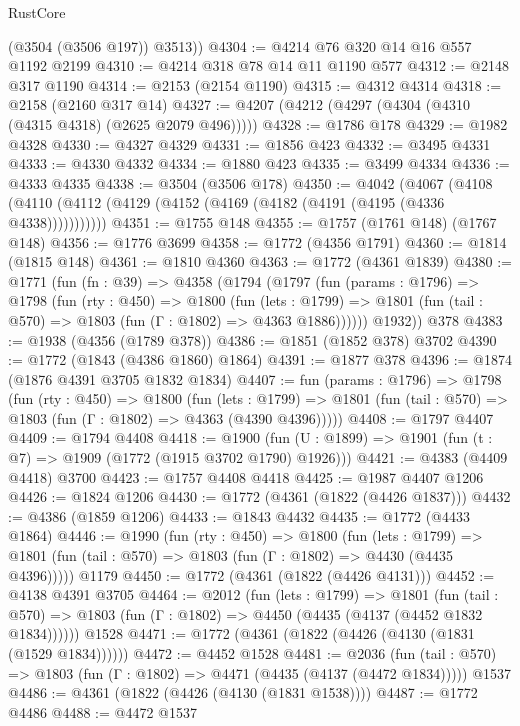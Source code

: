 \begin{lexlean}{RustCore}
\begin{coremodule}
        (@3504 (@3506 @197))
        @3513))
@4304 := @4214 @76 @320 @14 @16 @557 @1192 @2199
@4310 := @4214 @318 @78 @14 @11 @1190 @577
@4312 := @2148 @317 @1190
@4314 := @2153 (@2154 @1190)
@4315 := @4312 @4314
@4318 := @2158 (@2160 @317 @14)
@4327 := @4207 (@4212 (@4297 (@4304 (@4310 (@4315 @4318) (@2625 @2079 @496)))))
@4328 := @1786 @178
@4329 := @1982 @4328
@4330 := @4327 @4329
@4331 := @1856 @423
@4332 := @3495 @4331
@4333 := @4330 @4332
@4334 := @1880 @423
@4335 := @3499 @4334
@4336 := @4333 @4335
@4338 := @3504 (@3506 @178)
@4350 := @4042
    (@4067 (@4108 (@4110 (@4112 (@4129 (@4152 (@4169 (@4182 (@4191 (@4195 (@4336 @4338)))))))))))
@4351 := @1755 @148
@4355 := @1757 (@1761 @148) (@1767 @148)
@4356 := @1776 @3699
@4358 := @1772 (@4356 @1791)
@4360 := @1814 (@1815 @148)
@4361 := @1810 @4360
@4363 := @1772 (@4361 @1839)
@4380 := @1771
    (fun (fn : @39) =>
    @4358
      (@1794
        (@1797
          (fun (params : @1796) =>
          @1798
            (fun (rty : @450) =>
            @1800
              (fun (lets : @1799) =>
              @1801 (fun (tail : @570) => @1803 (fun (Γ : @1802) => @4363 @1886))))))
        @1932))
    @378
@4383 := @1938 (@4356 (@1789 @378))
@4386 := @1851 (@1852 @378) @3702
@4390 := @1772 (@1843 (@4386 @1860) @1864)
@4391 := @1877 @378
@4396 := @1874 (@1876 @4391 @3705 @1832 @1834)
@4407 := fun (params : @1796) =>
  @1798
    (fun (rty : @450) =>
    @1800
      (fun (lets : @1799) =>
      @1801 (fun (tail : @570) => @1803 (fun (Γ : @1802) => @4363 (@4390 @4396)))))
@4408 := @1797 @4407
@4409 := @1794 @4408
@4418 := @1900 (fun (U : @1899) => @1901 (fun (t : @7) => @1909 (@1772 (@1915 @3702 @1790) @1926)))
@4421 := @4383 (@4409 @4418) @3700
@4423 := @1757 @4408 @4418
@4425 := @1987 @4407 @1206
@4426 := @1824 @1206
@4430 := @1772 (@4361 (@1822 (@4426 @1837)))
@4432 := @4386 (@1859 @1206)
@4433 := @1843 @4432
@4435 := @1772 (@4433 @1864)
@4446 := @1990
    (fun (rty : @450) =>
    @1800
      (fun (lets : @1799) =>
      @1801 (fun (tail : @570) => @1803 (fun (Γ : @1802) => @4430 (@4435 @4396)))))
    @1179
@4450 := @1772 (@4361 (@1822 (@4426 @4131)))
@4452 := @4138 @4391 @3705
@4464 := @2012
    (fun (lets : @1799) =>
    @1801
      (fun (tail : @570) => @1803 (fun (Γ : @1802) => @4450 (@4435 (@4137 (@4452 @1832 @1834))))))
    @1528
@4471 := @1772 (@4361 (@1822 (@4426 (@4130 (@1831 (@1529 @1834))))))
@4472 := @4452 @1528
@4481 := @2036
    (fun (tail : @570) => @1803 (fun (Γ : @1802) => @4471 (@4435 (@4137 (@4472 @1834)))))
    @1537
@4486 := @4361 (@1822 (@4426 (@4130 (@1831 @1538))))
@4487 := @1772 @4486
@4488 := @4472 @1537

\end{coremodule}
\end{lexlean}
